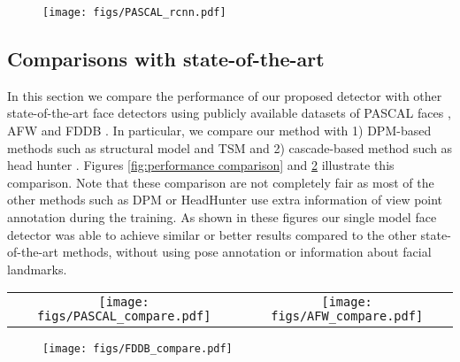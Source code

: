 \documentclass{sig-alternate-2013}
\begin{document}
\begin{figure}[t]
  \centering
    \texttt{[image: figs/PASCAL\_rcnn.pdf]}
  \caption{} 
  \label{fig:rcnn_results} 
  \vspace{-.1in}
\end{figure} 

\subsection{Comparisons with state-of-the-art} 

In this section we compare the performance of our proposed detector with other state-of-the-art face detectors using publicly available datasets of  PASCAL faces \cite{structural_model}, AFW \cite{tsm} and FDDB \cite{fddb}. In particular, we compare our method with 1) DPM-based methods such as structural model \cite{structural_model} and TSM \cite{tsm} and 2) cascade-based method such as head hunter \cite{head_hunter}. Figures \ref{fig:performance comparison} and \ref{fig:performance_comparison_fddb} illustrate this comparison. Note that these comparison are not completely fair as most of the other methods such as DPM or HeadHunter use extra information of view point annotation during the training. As shown in these figures our single model face detector was able to achieve similar or better results compared to the other state-of-the-art methods, without using pose annotation or information about facial landmarks.


\begin{figure*}[t]
  \centering
  	\begin{tabular}{cc}
    	\texttt{[image: figs/PASCAL\_compare.pdf]} &
    	\texttt{[image: figs/AFW\_compare.pdf]}
    \end{tabular}
  \caption{}
  \label{fig:performance comparison}
  \vspace{-.1in}
\end{figure*}


\begin{figure}[t]
  \centering
  \texttt{[image: figs/FDDB\_compare.pdf]}
  \caption{}
  \label{fig:performance_comparison_fddb}
    \vspace{-.1in}
\end{figure}
\end{document}
